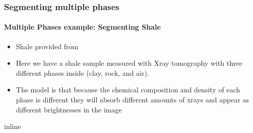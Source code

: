 \documentclass[letterpaper,10pt,english]{sphinxmanual}
\begin{document}
\subsubsection{Segmenting multiple phases}
\label{\detokenize{04-BasicSegmentation_Part2:segmenting-multiple-phases}}

\paragraph{Multiple Phases example: Segmenting Shale}
\label{\detokenize{04-BasicSegmentation_Part2:multiple-phases-example-segmenting-shale}}\begin{itemize}
\item {} 
\sphinxAtStartPar
Shale provided from 

\item {} 
\sphinxAtStartPar
Here we have a shale sample measured with X\sphinxhyphen{}ray tomography with three different phases inside (clay, rock, and air).

\item {} 
\sphinxAtStartPar
The model is that because the chemical composition and density of each phase is different they will absorb different amounts of x\sphinxhyphen{}rays and appear as different brightnesses in the image

\end{itemize}

\begin{sphinxVerbatim}[commandchars=\\\{\}]
   
   
   
   
 inline
\end{sphinxVerbatim}

\begin{sphinxVerbatim}[commandchars=\\\{\}]
  
     
 
\end{sphinxVerbatim}
\end{document}
